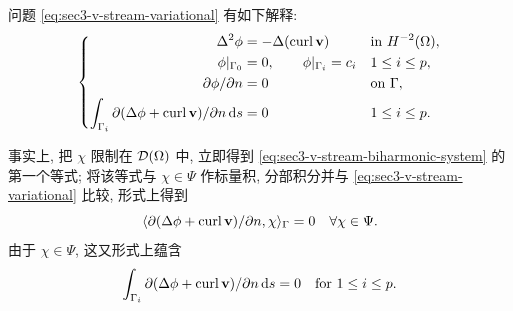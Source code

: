 \setcounter{statement}{2}
\begin{Remark}\label{rem:sec3-v-stream-biharmonic-interpretation}
问题 \eqref{eq:sec3-v-stream-variational} 有如下解释:
\begin{equation}\label{eq:sec3-v-stream-biharmonic-system}
\left\{\begin{aligned}
\Delta^2\phi&=-\Delta(\operatorname{curl}\mathbf v)&&\text{in }H^{-2}(\Omega),\\
\phi|_{\Gamma_0}&=0,\qquad
\phi|_{\Gamma_i}=c_i&&1\le i\le p,\\
\partial\phi/\partial n&=0&&\text{on }\Gamma,\\
\int_{\Gamma_i}\partial(\Delta\phi+\operatorname{curl}\mathbf v)/\partial n\,\mathrm{d} s&=0
&&1\le i\le p.
\end{aligned}\right.
\end{equation}

事实上, 把 $\chi$ 限制在 $\mathcal{D}(\Omega)$ 中, 立即得到
\eqref{eq:sec3-v-stream-biharmonic-system} 的第一个等式; 将该等式与
$\chi\in\Psi$ 作标量积, 分部积分并与 \eqref{eq:sec3-v-stream-variational} 比较, 形式上得到
\[
\langle\partial(\Delta\phi+\operatorname{curl}\mathbf v)/\partial n,\chi\rangle_\Gamma=0
\quad\forall\chi\in\Psi.
\]
由于 $\chi\in\Psi$, 这又形式上蕴含
\[
\int_{\Gamma_i}\partial(\Delta\phi+\operatorname{curl}\mathbf v)/\partial n\,\mathrm{d} s=0
\quad\text{for }1\le i\le p.
\]
\end{Remark}

